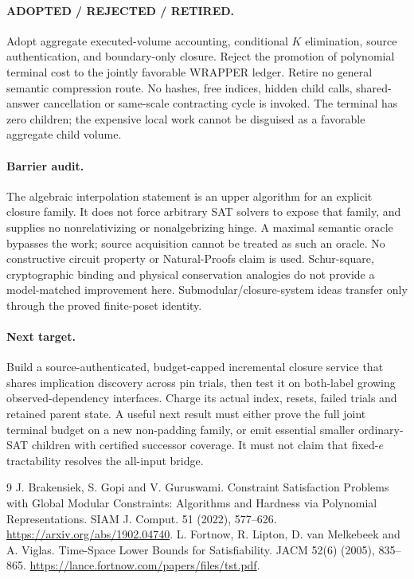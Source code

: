 \documentclass[11pt]{article}
\begin{document}
\paragraph{ADOPTED / REJECTED / RETIRED.}
Adopt aggregate executed-volume accounting, conditional $K$ elimination,
source authentication, and boundary-only closure. Reject the promotion of
polynomial terminal cost to the jointly favorable WRAPPER ledger. Retire no
general semantic compression route. No hashes, free indices, hidden child
calls, shared-answer cancellation or same-scale contracting cycle is invoked.
The terminal has zero children; the expensive local work cannot be disguised
as a favorable aggregate child volume.

\paragraph{Barrier audit.}
The algebraic interpolation statement is an upper algorithm for an explicit
closure family. It does not force arbitrary SAT solvers to expose that family,
and supplies no nonrelativizing or nonalgebrizing hinge. A maximal semantic
oracle bypasses the work; source acquisition cannot be treated as such an
oracle. No constructive circuit property or Natural-Proofs claim is used.
Schur-square, cryptographic binding and physical conservation analogies do
not provide a model-matched improvement here. Submodular/closure-system
ideas transfer only through the proved finite-poset identity.

\paragraph{Next target.}
Build a source-authenticated, budget-capped incremental closure service that
shares implication discovery across pin trials, then test it on both-label
growing observed-dependency interfaces. Charge its actual index, resets,
failed trials and retained parent state. A useful next result must either
prove the full joint terminal budget on a new non-padding family, or emit
essential smaller ordinary-SAT children with certified successor coverage.
It must not claim that fixed-$e$ tractability resolves the all-input bridge.

\begin{thebibliography}{9}
 J. Brakensiek, S. Gopi and V. Guruswami.
Constraint Satisfaction Problems with Global Modular Constraints: Algorithms
and Hardness via Polynomial Representations. SIAM J. Comput. 51 (2022),
577--626. \url{https://arxiv.org/abs/1902.04740}.
 L. Fortnow, R. Lipton, D. van Melkebeek and A. Viglas.
Time-Space Lower Bounds for Satisfiability. JACM 52(6) (2005), 835--865.
\url{https://lance.fortnow.com/papers/files/tst.pdf}.
\end{thebibliography}
\end{document}
